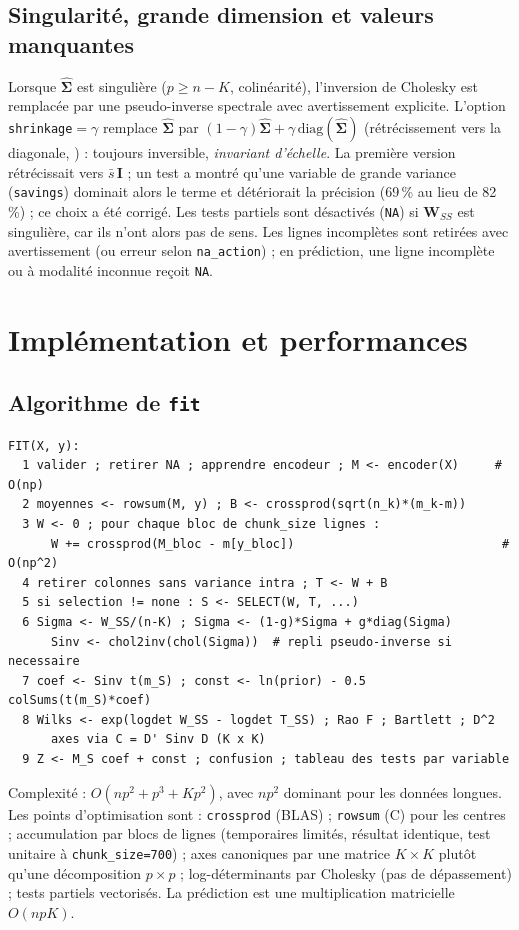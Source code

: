 \documentclass[10.5pt,a4paper]{article}
\newcommand{\code}[1]{\texttt{#1}}
\newcommand{\bm}[1]{\mathbf{#1}}
\begin{document}
\subsection{Singularit\'e, grande dimension et valeurs manquantes}
Lorsque $\hat{\bm\Sigma}$ est singuli\`ere ($p\ge n-K$, colinéarit\'e), l'inversion de Cholesky est remplac\'ee par une pseudo-inverse spectrale avec avertissement explicite. L'option \code{shrinkage}$=\gamma$ remplace $\hat{\bm\Sigma}$ par $(1-\gamma)\hat{\bm\Sigma}+\gamma\,\mathrm{diag}(\hat{\bm\Sigma})$ (r\'etr\'ecissement vers la diagonale, \cite{friedman,schafer}) : toujours inversible, \emph{invariant d'\'echelle}. La premi\`ere version r\'etr\'ecissait vers $\bar s\,\bm I$ ; un test a montr\'e qu'une variable de grande variance (\code{savings}) dominait alors le terme et d\'et\'eriorait la pr\'ecision (69\,\% au lieu de 82\,\%)  ; ce choix a \'et\'e corrig\'e. Les tests partiels sont d\'esactiv\'es (\code{NA}) si $\bm W_{SS}$ est singuli\`ere, car ils n'ont alors pas de sens. Les lignes incompl\`etes sont retir\'ees avec avertissement (ou erreur selon \code{na\_action}) ; en pr\'ediction, une ligne incompl\`ete ou \`a modalit\'e inconnue re\c{c}oit \code{NA}.

\section{Impl\'ementation et performances}\label{sec:perf}
\subsection{Algorithme de \code{fit}}
\begin{small}
\begin{verbatim}
FIT(X, y):
  1 valider ; retirer NA ; apprendre encodeur ; M <- encoder(X)     # O(np)
  2 moyennes <- rowsum(M, y) ; B <- crossprod(sqrt(n_k)*(m_k-m))
  3 W <- 0 ; pour chaque bloc de chunk_size lignes :
      W += crossprod(M_bloc - m[y_bloc])                             # O(np^2)
  4 retirer colonnes sans variance intra ; T <- W + B
  5 si selection != none : S <- SELECT(W, T, ...)
  6 Sigma <- W_SS/(n-K) ; Sigma <- (1-g)*Sigma + g*diag(Sigma)
      Sinv <- chol2inv(chol(Sigma))  # repli pseudo-inverse si necessaire
  7 coef <- Sinv t(m_S) ; const <- ln(prior) - 0.5 colSums(t(m_S)*coef)
  8 Wilks <- exp(logdet W_SS - logdet T_SS) ; Rao F ; Bartlett ; D^2
      axes via C = D' Sinv D (K x K)
  9 Z <- M_S coef + const ; confusion ; tableau des tests par variable
\end{verbatim}
\end{small}
Complexit\'e : $O(np^2+p^3+Kp^2)$, avec $np^2$ dominant pour les donn\'ees longues. Les points d'optimisation sont : \code{crossprod} (BLAS) ; \code{rowsum} (C) pour les centres ; accumulation par blocs de lignes (temporaires limit\'es, r\'esultat identique, test unitaire \`a \code{chunk\_size=700}) ; axes canoniques par une matrice $K\times K$ plut\^ot qu'une d\'ecomposition $p\times p$ ; log-d\'eterminants par Cholesky (pas de d\'epassement) ; tests partiels vectoris\'es. La pr\'ediction est une multiplication matricielle $O(npK)$.
\end{document}
